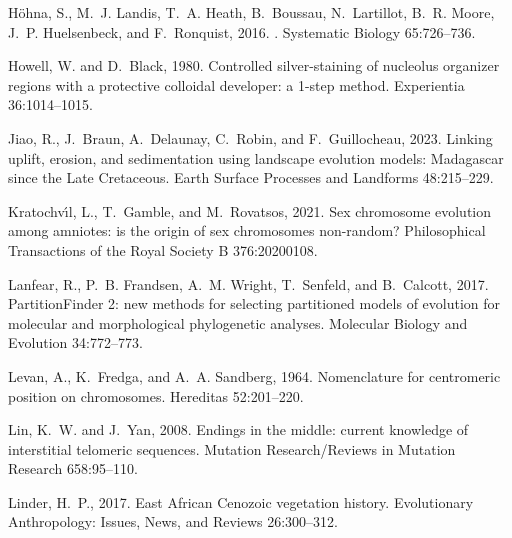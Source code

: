 \documentclass[a4paper, 12pt]{article}
\begin{document}
\begin{thebibliography}{73}
H{\"o}hna, S., M.~J. Landis, T.~A. Heath, B.~Boussau, N.~Lartillot, B.~R.
  Moore, J.~P. Huelsenbeck, and F.~Ronquist, 2016.
.
\newblock Systematic Biology 65:726--736.

Howell, W. and D.~Black, 1980.
\newblock Controlled silver-staining of nucleolus organizer regions with a
  protective colloidal developer: a 1-step method.
\newblock Experientia 36:1014--1015.

Jiao, R., J.~Braun, A.~Delaunay, C.~Robin, and F.~Guillocheau, 2023.
\newblock Linking uplift, erosion, and sedimentation using landscape evolution
  models: {M}adagascar since the {L}ate {C}retaceous.
\newblock Earth Surface Processes and Landforms 48:215--229.

Kratochv{\'\i}l, L., T.~Gamble, and M.~Rovatsos, 2021.
\newblock Sex chromosome evolution among amniotes: is the origin of sex
  chromosomes non-random?
\newblock Philosophical Transactions of the Royal Society B 376:20200108.

Lanfear, R., P.~B. Frandsen, A.~M. Wright, T.~Senfeld, and B.~Calcott, 2017.
\newblock Partition{F}inder 2: new methods for selecting partitioned models of
  evolution for molecular and morphological phylogenetic analyses.
\newblock Molecular Biology and Evolution 34:772--773.

Levan, A., K.~Fredga, and A.~A. Sandberg, 1964.
\newblock Nomenclature for centromeric position on chromosomes.
\newblock Hereditas 52:201--220.

Lin, K.~W. and J.~Yan, 2008.
\newblock Endings in the middle: current knowledge of interstitial telomeric
  sequences.
\newblock Mutation Research/Reviews in Mutation Research 658:95--110.

Linder, H.~P., 2017.
\newblock East {A}frican {C}enozoic vegetation history.
\newblock Evolutionary Anthropology: Issues, News, and Reviews 26:300--312.


\end{thebibliography}
\end{document}
